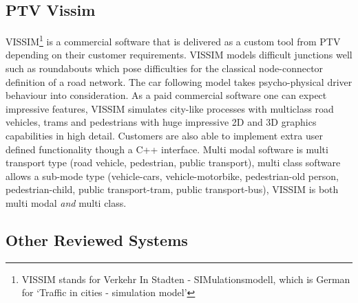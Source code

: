 	
\subsection*{PTV Vissim}

	VISSIM\footnote{VISSIM stands for Verkehr In Stadten - SIMulationsmodell, which is German for `Traffic in cities - simulation model'} is a commercial software that is delivered as a custom tool from PTV depending on their customer requirements. VISSIM models difficult junctions well such as roundabouts which pose difficulties for the classical node-connector definition of a road network. The car following model takes psycho-physical driver behaviour into consideration. As a paid commercial software one can expect impressive features, VISSIM simulates city-like processes with multiclass road vehicles, trams and pedestrians with huge impressive 2D and 3D graphics capabilities in high detail. Customers are also able to implement extra user defined functionality though a C++ interface. Multi modal software is multi transport type (road vehicle, pedestrian, public transport), multi class software allows a sub-mode type (vehicle-cars, vehicle-motorbike, pedestrian-old person, pedestrian-child, public transport-tram, public transport-bus), VISSIM is both multi modal \emph{and} multi class.
	
\subsection*{Other Reviewed Systems}

